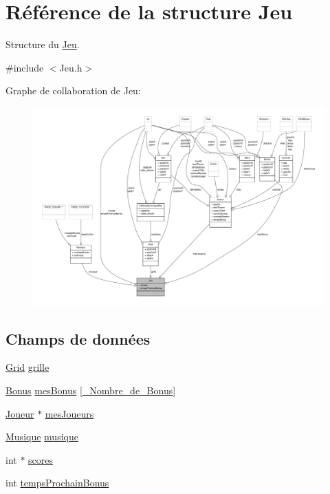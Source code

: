 \hypertarget{structJeu}{\section{Référence de la structure Jeu}
\label{structJeu}
}


Structure du \hyperlink{structJeu}{Jeu}.  




{\ttfamily \#include $<$Jeu.\-h$>$}



Graphe de collaboration de Jeu\-:\nopagebreak
\begin{figure}[H]
\begin{center}
\leavevmode
\includegraphics[width=350pt]{structJeu__coll__graph}
\end{center}
\end{figure}
\subsection*{Champs de données}
\begin{DoxyCompactItemize}
\item 
\hyperlink{structGrid}{Grid} \hyperlink{structJeu_a004d8d0f888b9dea26cbbc2d6afea6e7}{grille}
\item 
\hyperlink{structBonus}{Bonus} \hyperlink{structJeu_a70bf0e19753aaa6cfba719388aae410d}{mes\-Bonus} \mbox{[}\hyperlink{Constantes_8h_af4e31715ab308023d6200e64b86b9946}{\-\_\-\-Nombre\-\_\-de\-\_\-\-Bonus}\mbox{]}
\item 
\hyperlink{structJoueur}{Joueur} $\ast$ \hyperlink{structJeu_aafbe63ae87dd9d9b17e69ae94123ee31}{mes\-Joueurs}
\item 
\hyperlink{structMusique}{Musique} \hyperlink{structJeu_a254bcdad7f9995cb345b777980ffdbe0}{musique}
\item 
int $\ast$ \hyperlink{structJeu_a3db4303dcbb7630f11d5bfdf4a7bf181}{scores}
\item 
int \hyperlink{structJeu_a08a8620c89aa61ed6bbeb2dcf6c68a40}{temps\-Prochain\-Bonus}
\end{DoxyCompactItemize}



